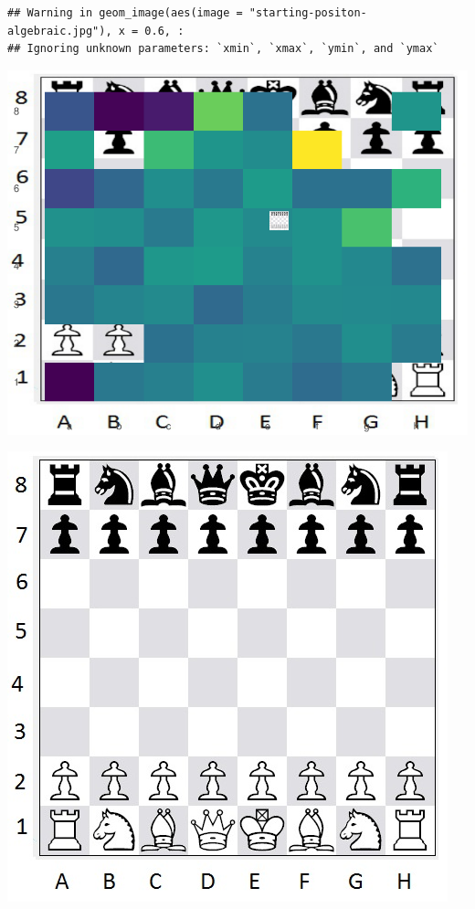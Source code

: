\documentclass[
]{article}
\begin{document}
\begin{verbatim}
## Warning in geom_image(aes(image = "starting-positon-algebraic.jpg"), x = 0.6, :
## Ignoring unknown parameters: `xmin`, `xmax`, `ymin`, and `ymax`
\end{verbatim}

\includegraphics{STAT842_Assignment2_files/figure-latex/unnamed-chunk-6-1.pdf}

\includegraphics{starting-positon-algebraic.jpg}
\end{document}
